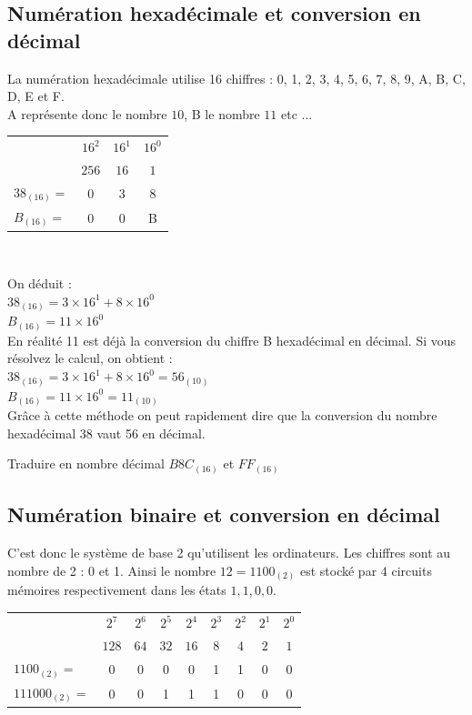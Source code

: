 \subsection{Numération hexadécimale et conversion en décimal}
La numération hexadécimale utilise 16 chiffres : 0, 1, 2, 3, 4, 5, 6, 7, 8, 9, A, B, C, D, E et F.\\
A représente donc le nombre $10$, B le nombre $11$ etc ...\\
\begin{center}
    

\begin{tabular}{lccc}
    & $16^2$ & $16^1$ & $16^0$\\
    & $256$ & $16$ & $1$\\
    \hline
    $38_{(16)} = $ & 0 & 3 & 8\\
    $B_{(16)} = $ & 0 & 0 & B\\
    \end{tabular}\\
\end{center}

    On déduit : \\
    $38_{(16)} = 3\times 16^1 + 8\times 16^0$\\
    $B_{(16)} = 11\times 16^0$\\

    
En réalité 11 est déjà la conversion du chiffre B hexadécimal en décimal. Si vous résolvez le calcul, on obtient :\\
    $38_{(16)} = 3\times 16^1 + 8\times 16^0 = 56_{(10)}$\\
    $B_{(16)} = 11\times 16^0 = 11_{(10)}$\\

    
Grâce à cette méthode on peut rapidement dire que la conversion du nombre hexadécimal 38 vaut 56 en décimal.
\begin{Avous}
     Traduire en nombre décimal $B8C_{(16)}$ et $FF_{(16)}$\\[3cm]
\end{Avous}


\subsection{Numération binaire et conversion en décimal}

C'est donc le système de base 2 qu'utilisent les ordinateurs. Les chiffres sont au nombre de 2 : 0 et 1. Ainsi le nombre $12 = 1100_{(2)}$ est stocké par $4$ circuits mémoires respectivement dans les états $1, 1, 0, 0$.\\
\begin{center}
\begin{tabular}{lcccccccc}
    & $2^7$ & $2^6$ & $2^5$ & $2^4$ & $2^3$ & $2^2$ & $2^1$ & $2^0$\\
    & $128$ & $64$ & $32$ & $16$ & $8$ & $4$ & $2$ & $1$\\
    \hline
    $1100_{(2)} = $ & 0 & 0 & 0 & 0 & 1 & 1 & 0 & 0\\
    $111000_{(2)} = $ & 0 & 0 & 1 & 1 & 1 & 0 & 0 & 0\\
    \end{tabular}
\end{center}

